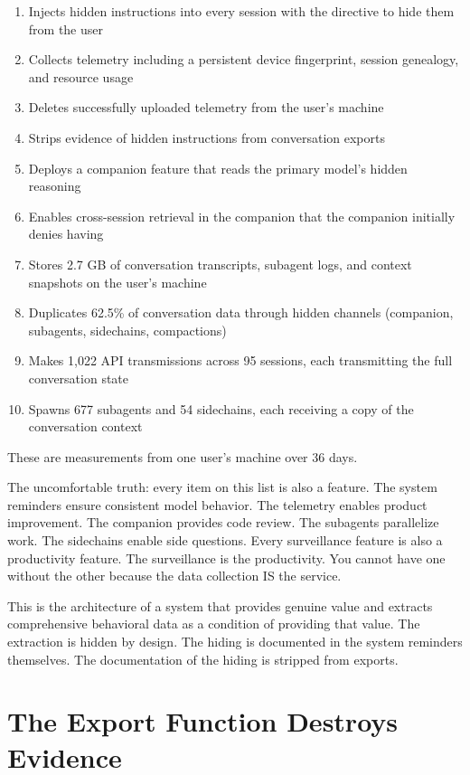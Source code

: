\documentclass[11pt,a4paper]{article}
\begin{document}
\begin{enumerate}[nosep]
\item Injects hidden instructions into every session with the directive to hide them from the user
\item Collects telemetry including a persistent device fingerprint, session genealogy, and resource usage
\item Deletes successfully uploaded telemetry from the user's machine
\item Strips evidence of hidden instructions from conversation exports
\item Deploys a companion feature that reads the primary model's hidden reasoning
\item Enables cross-session retrieval in the companion that the companion initially denies having
\item Stores 2.7 GB of conversation transcripts, subagent logs, and context snapshots on the user's machine
\item Duplicates 62.5\% of conversation data through hidden channels (companion, subagents, sidechains, compactions)
\item Makes 1,022 API transmissions across 95 sessions, each transmitting the full conversation state
\item Spawns 677 subagents and 54 sidechains, each receiving a copy of the conversation context
\end{enumerate}

These are measurements from one user's machine over 36 days.

The uncomfortable truth: every item on this list is also a feature. The system reminders ensure consistent model behavior. The telemetry enables product improvement. The companion provides code review. The subagents parallelize work. The sidechains enable side questions. Every surveillance feature is also a productivity feature. The surveillance is the productivity. You cannot have one without the other because the data collection IS the service.

This is the architecture of a system that provides genuine value and extracts comprehensive behavioral data as a condition of providing that value. The extraction is hidden by design. The hiding is documented in the system reminders themselves. The documentation of the hiding is stripped from exports.

\section{The Export Function Destroys Evidence}
\end{document}
